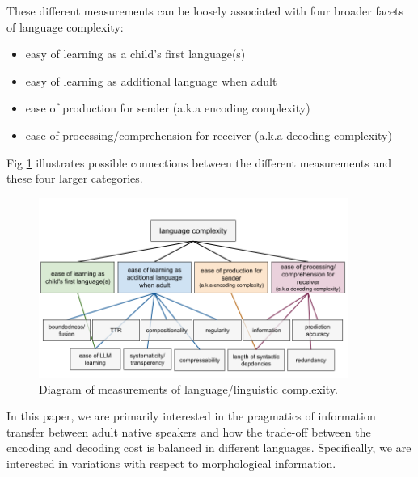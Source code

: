 \documentclass[USenglish]{article}
\begin{document}
These different measurements can be loosely associated with four broader facets of language complexity:

\begin{itemize}
\item easy of learning as a child's first language(s)
\item easy of learning as additional language when adult
\item ease of production for sender (a.k.a encoding complexity)
\item ease of processing/comprehension for receiver (a.k.a decoding complexity)
\end{itemize}

Fig \ref{fig:metrics_diagram} illustrates possible connections between the different measurements and these four larger categories.

\begin{figure}[ht]
    \centering
    \includegraphics[width=0.9\textwidth]{latex/graphics/ud_complexity_metrics.png} %
    \caption{Diagram of measurements of language/linguistic complexity.}
    \label{fig:metrics_diagram}
\end{figure}

In this paper, we are primarily interested in the pragmatics of information transfer between adult native speakers and how the trade-off between the encoding and decoding cost is balanced in different languages. Specifically, we are interested in variations with respect to morphological information.



\end{document}
